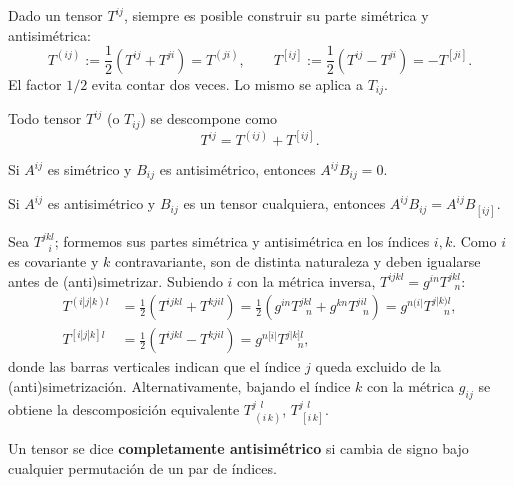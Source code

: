 \begin{definicion}
Dado un tensor $T^{ij}$, siempre es posible construir su parte simétrica
y antisimétrica:
\[
T^{(ij)} := \frac{1}{2}\left(T^{ij}+T^{ji}\right) = T^{(ji)}, \qquad
T^{[ij]} := \frac{1}{2}\left(T^{ij}-T^{ji}\right) = -T^{[ji]} .
\]
El factor $1/2$ evita contar dos veces. Lo mismo se aplica a $T_{ij}$.
\end{definicion}

\begin{proposicionc}
Todo tensor $T^{ij}$ (o $T_{ij}$) se descompone como
\[
T^{ij} = T^{(ij)} + T^{[ij]} .
\]
\end{proposicionc}

\begin{proposicionc}
Si $A^{ij}$ es simétrico y $B_{ij}$ es antisimétrico, entonces
$A^{ij}B_{ij}=0$.
\end{proposicionc}

\begin{proposicionc}
Si $A^{ij}$ es antisimétrico y $B_{ij}$ es un tensor cualquiera, entonces
$A^{ij}B_{ij} = A^{ij}B_{[ij]}$.
\end{proposicionc}

\begin{ejemplo}
Sea $T^{jkl}_{\ \ \ i}$; formemos sus partes simétrica y antisimétrica en
los índices $i,k$. Como $i$ es covariante y $k$ contravariante, son de
distinta naturaleza y deben igualarse antes de (anti)simetrizar. Subiendo
$i$ con la métrica inversa, $T^{ijkl}=g^{in}T^{jkl}_{\ \ \ n}$:
\begin{align*}
T^{(i|j|k)l} &= \frac{1}{2}\left(T^{ijkl}+T^{kjil}\right) =
\frac{1}{2}\left(g^{in}T^{jkl}_{\ \ \ n} + g^{kn}T^{jil}_{\ \ \ n}\right)
= g^{n(i|}T^{j|k)l}_{\quad\ n}, \\
T^{[i|j|k]l} &= \frac{1}{2}\left(T^{ijkl}-T^{kjil}\right) = g^{n[i|}
T^{j|k]l}_{\quad\ n},
\end{align*}
donde las barras verticales indican que el índice $j$ queda excluido de
la (anti)simetrización. Alternativamente, bajando el índice $k$ con la
métrica $g_{ij}$ se obtiene la descomposición equivalente
$T^{j\ \ l}_{\ (i\,k)}$, $T^{j\ \ l}_{\ [i\,k]}$.
\end{ejemplo}

\begin{definicion}
Un tensor se dice \textbf{completamente antisimétrico} si cambia de
signo bajo cualquier permutación de un par de índices.
\end{definicion}

